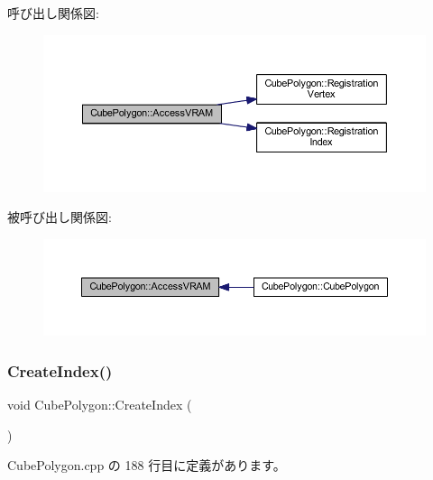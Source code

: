 呼び出し関係図\+:\nopagebreak
\begin{figure}[H]
\begin{center}
\leavevmode
\includegraphics[width=350pt]{class_cube_polygon_a715db255bf7ebd3c3aec2095d73b9399_cgraph}
\end{center}
\end{figure}
被呼び出し関係図\+:\nopagebreak
\begin{figure}[H]
\begin{center}
\leavevmode
\includegraphics[width=350pt]{class_cube_polygon_a715db255bf7ebd3c3aec2095d73b9399_icgraph}
\end{center}
\end{figure}
\mbox{\label{class_cube_polygon_ade2e155c44798710b8e91ac84b02340f}} 
\subsubsection{\texorpdfstring{Create\+Index()}{CreateIndex()}}
{\footnotesize\ttfamily void Cube\+Polygon\+::\+Create\+Index (\begin{DoxyParamCaption}{ }\end{DoxyParamCaption})\hspace{0.3cm}{\ttfamily [private]}}



 Cube\+Polygon.\+cpp の 188 行目に定義があります。

